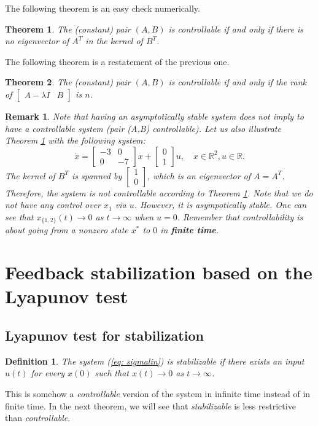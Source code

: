 \documentclass[11pt,a4paper,titlepage]{article}
\newtheorem{definition}{Definition}
\newtheorem{theorem}{Theorem}
\newtheorem{remark}{Remark}
\begin{document}
The following theorem is an easy check numerically.
\begin{theorem}
	\label{thm: atbt}
	The (constant) pair $(A,B)$ is controllable if and only if there is no eigenvector of $A^T$ in the kernel of $B^T$.
\end{theorem}
The following theorem is a restatement of the previous one.
\begin{theorem}
	The (constant) pair $(A,B)$ is controllable if and only if the rank of $\begin{bmatrix}A-\lambda I & B\end{bmatrix}$ is $n$.
\end{theorem}

\begin{remark}
	Note that having an asymptotically stable system does not imply to have a controllable system (pair (A,B) controllable). Let us also illustrate Theorem \ref{thm: atbt} with the following system:
\begin{equation}
	\dot x = \begin{bmatrix}-3 & 0 \\ 0 & -7\end{bmatrix}x + \begin{bmatrix}0 \\ 1\end{bmatrix}u, \quad x\in\mathbb{R}^2, u\in\mathbb{R}.
\end{equation}
	The kernel of $B^T$ is spanned by $\begin{bmatrix}1 \\ 0\end{bmatrix}$, which is an eigenvector of $A = A^T$. Therefore, the system is not controllable according to Theorem \ref{thm: atbt}. Note that we do not have any control over $x_1$ via $u$. However, it is asympotically stable. One can see that $x_{\{1,2\}}(t) \to 0$ as $t\to\infty$ when $u = 0$. Remember that controllability is about going from a nonzero state $x^*$ to $0$ in \textbf{finite time}.
\end{remark}

\section{Feedback stabilization based on the Lyapunov test}
\subsection{Lyapunov test for stabilization}
\begin{definition}
The system (\ref{eq: sigmalin}) is stabilizable if there exists an input $u(t)$ for every $x(0)$ such that $x(t)\to 0$ as $t\to\infty$.
\end{definition}
This is somehow a \emph{controllable} version of the system in infinite time instead of in finite time. In the next theorem, we will see that \emph{stabilizable} is less restrictive than \emph{controllable}.
\end{document}
